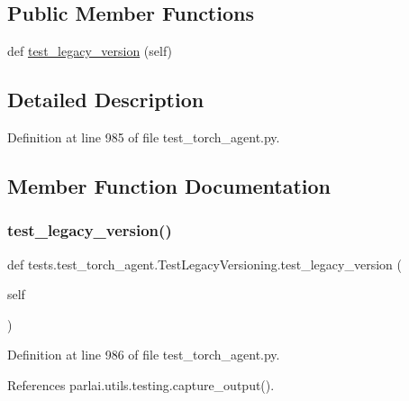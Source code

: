 \subsection*{Public Member Functions}
\begin{DoxyCompactItemize}
\item 
def \hyperlink{classtests_1_1test__torch__agent_1_1TestLegacyVersioning_ab1faa8a34d7089006cfa5746b0ada62f}{test\+\_\+legacy\+\_\+version} (self)
\end{DoxyCompactItemize}


\subsection{Detailed Description}


Definition at line 985 of file test\+\_\+torch\+\_\+agent.\+py.



\subsection{Member Function Documentation}
\mbox{\label{classtests_1_1test__torch__agent_1_1TestLegacyVersioning_ab1faa8a34d7089006cfa5746b0ada62f}} 
\subsubsection{\texorpdfstring{test\+\_\+legacy\+\_\+version()}{test\_legacy\_version()}}
{\footnotesize\ttfamily def tests.\+test\+\_\+torch\+\_\+agent.\+Test\+Legacy\+Versioning.\+test\+\_\+legacy\+\_\+version (\begin{DoxyParamCaption}\item[{}]{self }\end{DoxyParamCaption})}



Definition at line 986 of file test\+\_\+torch\+\_\+agent.\+py.



References parlai.\+utils.\+testing.\+capture\+\_\+output().

